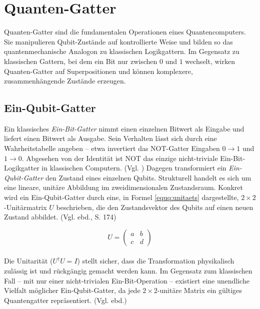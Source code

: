 \section{Quanten-Gatter}\label{sec:quanten_gatter}
Quanten-Gatter sind die fundamentalen Operationen eines Quantencomputers. Sie manipulieren Qubit-Zustände auf kontrollierte Weise und bilden so das quantenmechanische Analogon zu klassischen Logikgattern. Im Gegensatz zu klassischen Gattern, bei dem ein Bit nur zwischen $0$ und $1$ wechselt, wirken Quanten-Gatter auf Superpositionen und können komplexere, zusammenhängende Zustände erzeugen.
\\
\subsection{Ein-Qubit-Gatter}
Ein klassisches \emph{Ein-Bit-Gatter} nimmt einen einzelnen Bitwert als Eingabe und liefert einen Bitwert als Ausgabe. Sein Verhalten lässt sich durch eine Wahrheitstabelle angeben – etwa invertiert das NOT-Gatter Eingaben $0 \rightarrow 1$ und $1 \rightarrow 0$. Abgesehen von der Identität ist NOT das einzige nicht-triviale Ein-Bit-Logikgatter in klassischen Computern. (Vgl. \cite[S.17f.]{nielsen_quantum_2010}) Dagegen transformiert ein \emph{Ein-Qubit-Gatter} den Zustand eines einzelnen Qubits. Strukturell handelt es sich um eine lineare, unitäre Abbildung im zweidimensionalen Zustandsraum. Konkret wird ein Ein-Qubit-Gatter durch eine, in Formel \ref{equq:unitaets} dargestellte, $2\times 2$-Unitärmatrix $U$ beschrieben, die den Zustandsvektor des Qubits auf einen neuen Zustand abbildet. (Vgl. ebd., S. 174)

\begin{equation}\label{equq:unitaets}
U = \begin{pmatrix}
a & b \\
c & d
\end{pmatrix}
\end{equation}
\\
Die Unitarität ($U^{\dagger}U = I$) stellt sicher, dass die Transformation physikalisch zulässig ist und rückgängig gemacht werden kann. Im Gegensatz zum klassischen Fall – mit nur einer nicht-trivialen Ein-Bit-Operation – existiert eine unendliche Vielfalt möglicher Ein-Qubit-Gatter, da jede $2\times 2$-unitäre Matrix ein gültiges Quantengatter repräsentiert. (Vgl. ebd.)\\



